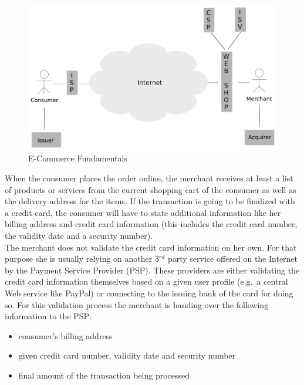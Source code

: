 \begin{figure}[H]
	\centering
		\includegraphics[width=0.8\columnwidth]{images/e-commerce-scenario.pdf}
	\caption{E-Commerce Fundamentals}
\label{fig:images_ecommerce_scenario}
\end{figure}

When the consumer places the order online, the merchant receives at least a list of products or services from the current shopping cart of the consumer as well as the delivery address for the items. If the transaction is going to be finalized with a credit card, the consumer will have to state additional information like her billing address and credit card information (this includes the credit card number, the validity date and a security number). \\
The merchant does not validate the credit card information on her own. For that purpose she is usually relying on another 3$^{rd}$ party service offered on the Internet by the Payment Service Provider (PSP). These providers are either validating the credit card information themselves based on a given user profile (e.g.\ a central Web service like PayPal) or connecting to the issuing bank of the card for doing so. For this validation process the merchant is handing over the following information to the PSP:\@

\begin{itemize}
    \item consumer's billing address
    \item given credit card number, validity date and security number
    \item final amount of the transaction being processed
\end{itemize}

